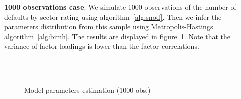 \documentclass[11pt,fleqn]{book} %
\begin{document}
\begin{example}
	\textbf{1000 observations case}. We simulate \num{1000} observations 
	of the number of defaults by sector-rating using algorithm~\ref{alg:snod}. 
	Then we infer the parameters distribution from this sample using 
	Metropolis-Hastings algorithm~\ref{alg:bimh}. The results are displayed in 
	figure~\ref{fig:calib1}. Note that the variance of factor loadings is 
	lower than the factor correlations.
	\begin{figure}[!ht]
		\centering
		\hfill
		\\
		\\
		\caption{Model parameters estimation (1000 obs.)}
		\label{fig:calib1}
	\end{figure}


\end{example}
\end{document}
